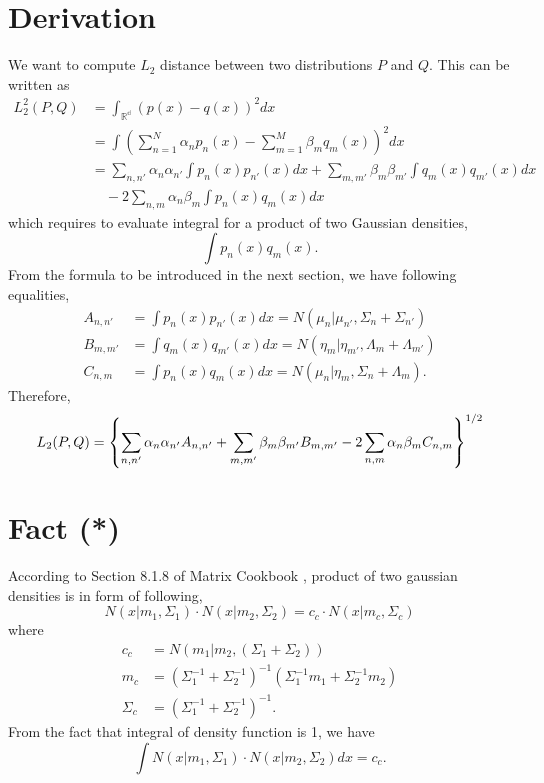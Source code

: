 \documentclass[fontsize=12pt]{article}
\begin{document}
\section{Derivation}

We want to compute $L_2$ distance between two distributions $P$ and $Q$. This can be written as
\begin{align*}
L_2^2(P,Q) &= \int_{\mathbb{{R}^d}} (p(x)-q(x))^2 dx \\
&= \int \left(
\sum_{n=1}^N \alpha_n p_n(x) - \sum_{m=1}^M \beta_m q_m (x) \right)^2 dx \\
&= 
\sum_{n,n'} \alpha_n \alpha_{n'} \int p_n (x) p_{n'}(x) dx +
\sum_{m,m'} \beta_m \beta_{m'} \int q_m (x) q_{m'} (x) dx \\
&\quad -2 \sum_{n,m} \alpha_n \beta_m \int p_n (x) q_m (x) dx
\end{align*}
which requires to evaluate integral for a product of two Gaussian densities, 
\begin{equation*}
\int p_n (x) q_m (x). \tag{*}
\end{equation*}
From the formula to be introduced in the next section, we have following equalities,
\begin{align*}
A_{n,n'} &= \int p_n (x) p_{n'} (x) dx = N(\mu_n | \mu_{n'}, \Sigma_n + \Sigma_{n'}) \\
B_{m,m'} &= \int q_m (x) q_{m'} (x) dx = N(\eta_m | \eta_{m'}, \Lambda_m + \Lambda_{m'}) \\
C_{n,m} &=\int p_n (x) q_m (x) dx = N(\mu_n | \eta_m, \Sigma_n + \Lambda_m).
\end{align*}
Therefore, 
\begin{equation*}
L_2 (P,Q) = \left\lbrace
\sum_{n,n'} \alpha_n \alpha_{n'} A_{n,n'} + 
\sum_{m,m'} \beta_m \beta_{m'} B_{m,m'} \\
- 2 \sum_{n,m} \alpha_n \beta_m C_{n,m}
\right\rbrace^{1/2}
\end{equation*}

\section*{Fact (*)}

According to Section 8.1.8 of Matrix Cookbook \citep{cookbook}, product of two gaussian densities is in form of following,
\begin{equation*}
N(x|m_1,\Sigma_1) \cdot N(x|m_2, \Sigma_2) = c_c \cdot N(x|m_c, \Sigma_c)
\end{equation*}
where
\begin{align*}
c_c &= N(m_1 | m_2, (\Sigma_1+\Sigma_2)) \\ 
m_c &= (\Sigma_1^{-1} + \Sigma_2^{-1})^{-1} (\Sigma_1^{-1} m_1 + \Sigma_2^{-1} m_2) \\
\Sigma_c &= (\Sigma_1^{-1} + \Sigma_2^{-1})^{-1}.
\end{align*}
From the fact that integral of density function is 1, we have
\begin{equation*}
\int N(x|m_1, \Sigma_1) \cdot N(x|m_2,\Sigma_2) dx = c_c .
\end{equation*}



\end{document}

